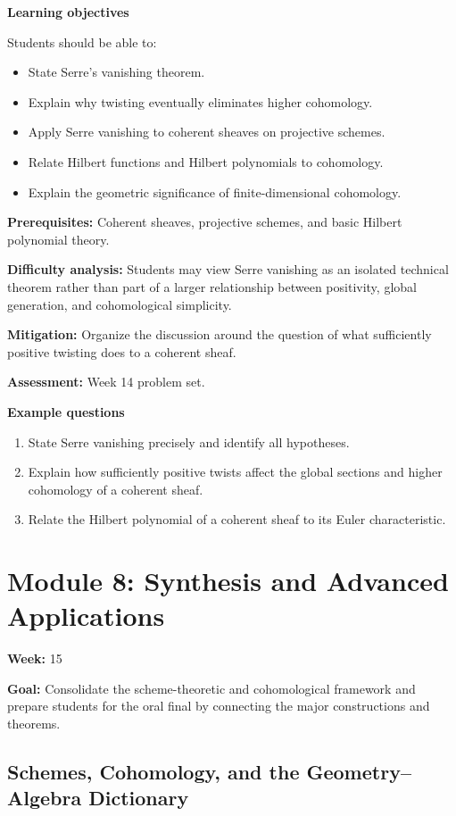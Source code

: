 \documentclass[11pt]{article}
\begin{document}
\textbf{Learning objectives}

Students should be able to:
\begin{itemize}
    \item State Serre's vanishing theorem.
    \item Explain why twisting eventually eliminates higher cohomology.
    \item Apply Serre vanishing to coherent sheaves on projective schemes.
    \item Relate Hilbert functions and Hilbert polynomials to cohomology.
    \item Explain the geometric significance of finite-dimensional cohomology.
\end{itemize}

\textbf{Prerequisites:} Coherent sheaves, projective schemes, and basic Hilbert polynomial theory.

\textbf{Difficulty analysis:} Students may view Serre vanishing as an isolated technical theorem rather than part of a larger relationship between positivity, global generation, and cohomological simplicity.

\textbf{Mitigation:} Organize the discussion around the question of what sufficiently positive twisting does to a coherent sheaf.

\textbf{Assessment:} Week 14 problem set.

\textbf{Example questions}
\begin{enumerate}
    \item State Serre vanishing precisely and identify all hypotheses.
    \item Explain how sufficiently positive twists affect the global sections and higher cohomology of a coherent sheaf.
    \item Relate the Hilbert polynomial of a coherent sheaf to its Euler characteristic.
\end{enumerate}

\section{Module 8: Synthesis and Advanced Applications}

\textbf{Week:} 15

\textbf{Goal:} Consolidate the scheme-theoretic and cohomological framework and prepare students for the oral final by connecting the major constructions and theorems.

\subsection{Schemes, Cohomology, and the Geometry--Algebra Dictionary}
\end{document}
